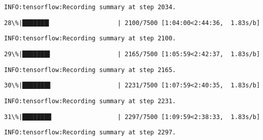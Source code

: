 \documentclass[11pt]{article}
\begin{document}
    \begin{Verbatim}[commandchars=\\\{\}]
INFO:tensorflow:Recording summary at step 2034.

    \end{Verbatim}

    \begin{Verbatim}[commandchars=\\\{\}]
 28\%|███████▎                  | 2100/7500 [1:04:00<2:44:36,  1.83s/b]
    \end{Verbatim}

    \begin{Verbatim}[commandchars=\\\{\}]
INFO:tensorflow:Recording summary at step 2100.

    \end{Verbatim}

    \begin{Verbatim}[commandchars=\\\{\}]
 29\%|███████▌                  | 2165/7500 [1:05:59<2:42:37,  1.83s/b]
    \end{Verbatim}

    \begin{Verbatim}[commandchars=\\\{\}]
INFO:tensorflow:Recording summary at step 2165.

    \end{Verbatim}

    \begin{Verbatim}[commandchars=\\\{\}]
 30\%|███████▋                  | 2231/7500 [1:07:59<2:40:35,  1.83s/b]
    \end{Verbatim}

    \begin{Verbatim}[commandchars=\\\{\}]
INFO:tensorflow:Recording summary at step 2231.

    \end{Verbatim}

    \begin{Verbatim}[commandchars=\\\{\}]
 31\%|███████▉                  | 2297/7500 [1:09:59<2:38:33,  1.83s/b]
    \end{Verbatim}

    \begin{Verbatim}[commandchars=\\\{\}]
INFO:tensorflow:Recording summary at step 2297.

    \end{Verbatim}
\end{document}
